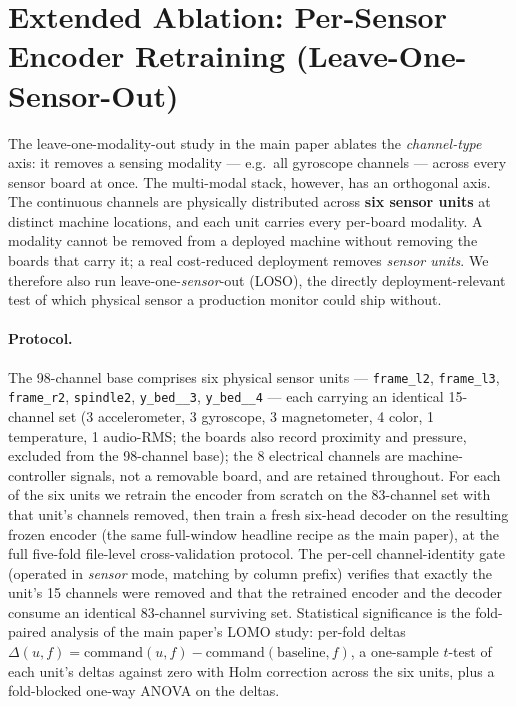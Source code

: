 \documentclass[11pt,a4paper]{article}
\begin{document}
\section{Extended Ablation: Per-Sensor Encoder Retraining (Leave-One-Sensor-Out)}
\label{app:loso-extended}
\label{sec:abl-lomo-sensor}

The leave-one-modality-out study in the main paper ablates the
\emph{channel-type} axis: it removes a sensing modality --- e.g.\ all
gyroscope channels --- across every sensor board at once. The multi-modal
stack, however, has an orthogonal axis. The continuous channels are
physically distributed across \textbf{six sensor units} at distinct machine
locations, and each unit carries every per-board modality. A modality cannot
be removed from a deployed machine without removing the boards that carry
it; a real cost-reduced deployment removes \emph{sensor units}. We therefore
also run leave-one-\emph{sensor}-out (LOSO), the directly deployment-relevant
test of which physical sensor a production monitor could ship without.

\paragraph{Protocol.} The 98-channel base comprises six physical sensor
units --- \texttt{frame\_l2}, \texttt{frame\_l3}, \texttt{frame\_r2},
\texttt{spindle2}, \texttt{y\_bed\_\_3}, \texttt{y\_bed\_\_4} --- each
carrying an identical 15-channel set (3 accelerometer, 3 gyroscope, 3
magnetometer, 4 color, 1 temperature, 1 audio-RMS; the boards also record
proximity and pressure, excluded from the 98-channel base); the 8 electrical
channels are machine-controller signals, not a removable board, and are
retained throughout. For each of the six units we retrain the encoder from
scratch on the 83-channel set with that unit's channels removed, then train
a fresh six-head decoder on the resulting frozen encoder (the same
full-window headline recipe as the main paper), at the full
five-fold file-level cross-validation protocol. The per-cell
channel-identity gate (operated in \emph{sensor} mode, matching by column
prefix) verifies that exactly the unit's 15 channels were removed and that
the retrained encoder and the decoder consume an identical 83-channel
surviving set. Statistical significance is the fold-paired analysis of
the main paper's LOMO study: per-fold deltas
$\Delta(u,f)=\text{command}(u,f)-\text{command}(\text{baseline},f)$, a
one-sample $t$-test of each unit's deltas against zero with Holm correction
across the six units, plus a fold-blocked one-way ANOVA on the deltas.
\end{document}
